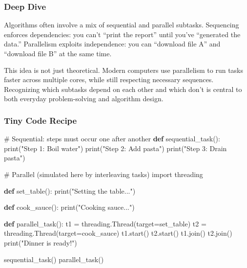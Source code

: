 \documentclass[
  letterpaper,
  DIV=11,
  numbers=noendperiod]{scrreprt}
\newenvironment{Shaded}{\begin{snugshade}}{\end{snugshade}}
\newcommand{\BuiltInTok}[1]{\textcolor[rgb]{0.00,0.23,0.31}{#1}}
\newcommand{\CommentTok}[1]{\textcolor[rgb]{0.37,0.37,0.37}{#1}}
\newcommand{\ImportTok}[1]{\textcolor[rgb]{0.00,0.46,0.62}{#1}}
\newcommand{\KeywordTok}[1]{\textcolor[rgb]{0.00,0.23,0.31}{\textbf{#1}}}
\newcommand{\NormalTok}[1]{\textcolor[rgb]{0.00,0.23,0.31}{#1}}
\newcommand{\OperatorTok}[1]{\textcolor[rgb]{0.37,0.37,0.37}{#1}}
\newcommand{\StringTok}[1]{\textcolor[rgb]{0.13,0.47,0.30}{#1}}
\begin{document}
\subsubsection{Deep Dive}\label{deep-dive-3}

Algorithms often involve a mix of sequential and parallel subtasks.
Sequencing enforces dependencies: you can't ``print the report'' until
you've ``generated the data.'' Parallelism exploits independence: you
can ``download file A'' and ``download file B'' at the same time.

This idea is not just theoretical. Modern computers use parallelism to
run tasks faster across multiple cores, while still respecting necessary
sequences. Recognizing which subtasks depend on each other and which
don't is central to both everyday problem-solving and algorithm design.

\subsubsection{Tiny Code Recipe}\label{tiny-code-recipe-31}

\begin{Shaded}
\begin{Highlighting}[]
\CommentTok{\# Sequential: steps must occur one after another}
\KeywordTok{def}\NormalTok{ sequential\_task():}
    \BuiltInTok{print}\NormalTok{(}\StringTok{"Step 1: Boil water"}\NormalTok{)}
    \BuiltInTok{print}\NormalTok{(}\StringTok{"Step 2: Add pasta"}\NormalTok{)}
    \BuiltInTok{print}\NormalTok{(}\StringTok{"Step 3: Drain pasta"}\NormalTok{)}

\CommentTok{\# Parallel (simulated here by interleaving tasks)}
\ImportTok{import}\NormalTok{ threading}

\KeywordTok{def}\NormalTok{ set\_table(): }
    \BuiltInTok{print}\NormalTok{(}\StringTok{"Setting the table..."}\NormalTok{)}

\KeywordTok{def}\NormalTok{ cook\_sauce():}
    \BuiltInTok{print}\NormalTok{(}\StringTok{"Cooking sauce..."}\NormalTok{)}

\KeywordTok{def}\NormalTok{ parallel\_task():}
\NormalTok{    t1 }\OperatorTok{=}\NormalTok{ threading.Thread(target}\OperatorTok{=}\NormalTok{set\_table)}
\NormalTok{    t2 }\OperatorTok{=}\NormalTok{ threading.Thread(target}\OperatorTok{=}\NormalTok{cook\_sauce)}
\NormalTok{    t1.start()}
\NormalTok{    t2.start()}
\NormalTok{    t1.join()}
\NormalTok{    t2.join()}
    \BuiltInTok{print}\NormalTok{(}\StringTok{"Dinner is ready!"}\NormalTok{)}

\NormalTok{sequential\_task()}
\NormalTok{parallel\_task()}
\end{Highlighting}
\end{Shaded}
\end{document}
